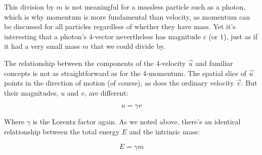 This division by $m$ is not meaningful for a massless particle such as a photon, which is why momentum is more fundamental than velocity, as momentum can be discussed for all particles regardless of whether they have mass. Yet it's interesting that a photon's 4-vector nevertheless has magnitude $c$ (or $1$), just as if it had a very small mass $m$ that we could divide by.

The relationship between the components of the 4-velocity $\vec{u}$ and familiar concepts is not as straightforward as for the 4-momentum. The spatial slice of $\vec{u}$ points in the direction of motion (of course), as does the ordinary velocity $\vec{v}$. But their magnitudes, $u$ and $v$, are different:

$$u = \gamma v$$

Where $\gamma$ is the Lorentz factor again. As we noted above, there's an identical relationship between the total energy $E$ and the intrinsic mass:

$$E = \gamma m$$


